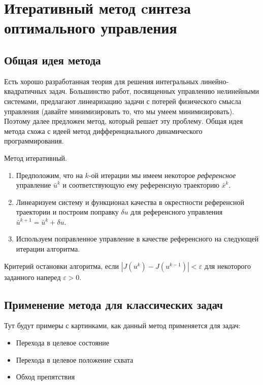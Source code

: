 \section{Итеративный метод cинтеза оптимального управления}

\subsection{Общая идея метода}

Есть хорошо разработанная теория для решения интегральных линейно-квадратичных задач.
Большинство работ, посвященных управлению нелинейными системами, предлагают линеаризацию задачи с потерей физического смысла управления (давайте минимизировать то, что мы умеем минимизировать).
Поэтому далее предложен метод, который решает эту проблему.
Общая идея метода схожа с идеей метод дифференциального динамического программирования.

Метод итеративный.
\begin{enumerate}
    \item Предположим, что на $k$-ой итерации мы имеем некоторое \textit{референсное} управление $\bar{u}^k$ и соответствующую ему референсную траекторию $\bar{x}^k$.
    \item Линеаризуем систему и функционал качества в окрестности референсной траектории и построим поправку $\delta u$ для референсного управления $\bar{u}^{k+1} = \bar{u}^k + \delta u$.
    \item Используем поправленное управление в качестве референсного на следующей итерации алгоритма.
\end{enumerate}
Критерий остановки алгоритма, если $|J(u^k) - J(u^{k-1})| < \varepsilon$ для некоторого заданного наперед $\varepsilon > 0$.

\subsection{Применение метода для классических задач}

Тут будут примеры с картинками, как данный метод применяется для задач:
\begin{itemize}
    \item Перехода в целевое состояние
    \item Перехода в целевое положение схвата
    \item Обход препятствия
\end{itemize}